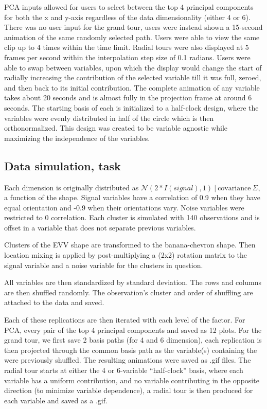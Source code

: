 \documentclass{monashthesis}
\begin{document}
PCA inputs allowed for users to select between the top 4 principal components for both the x and y-axis regardless of the data dimensionality (either 4 or 6). There was no user input for the grand tour, users were instead shown a 15-second animation of the same randomly selected path. Users were able to view the same clip up to 4 times within the time limit. Radial tours were also displayed at 5 frames per second within the interpolation step size of 0.1 radians. Users were able to swap between variables, upon which the display would change the start of radially increasing the contribution of the selected variable till it was full, zeroed, and then back to its initial contribution. The complete animation of any variable takes about 20 seconds and is almost fully in the projection frame at around 6 seconds. The starting basis of each is initialized to a half-clock design, where the variables were evenly distributed in half of the circle which is then orthonormalized. This design was created to be variable agnostic while maximizing the independence of the variables.

\hypertarget{data-simulation-task}{%
\subsection{Data simulation, task}\label{data-simulation-task}}

Each dimension is originally distributed as \(\mathcal{N}(2 * I(signal), 1)~|~\text{covariance}~\Sigma\), a function of the shape. Signal variables have a correlation of 0.9 when they have equal orientation and -0.9 when their orientations vary. Noise variables were restricted to 0 correlation. Each cluster is simulated with 140 observations and is offset in a variable that does not separate previous variables.

Clusters of the EVV shape are transformed to the banana-chevron shape. Then location mixing is applied by post-multiplying a (2x2) rotation matrix to the signal variable and a noise variable for the clusters in question.

All variables are then standardized by standard deviation. The rows and columns are then shuffled randomly. The observation's cluster and order of shuffling are attached to the data and saved.

Each of these replications are then iterated with each level of the factor. For PCA, every pair of the top 4 principal components and saved as 12 plots. For the grand tour, we first save 2 basis paths (for 4 and 6 dimension), each replication is then projected through the common basis path as the variable(s) containing the were previously shuffled. The resulting animations were saved as .gif files. The radial tour starts at either the 4 or 6-variable ``half-clock'' basis, where each variable has a uniform contribution, and no variable contributing in the opposite direction (to minimize variable dependence), a radial tour is then produced for each variable and saved as a .gif.
\end{document}
